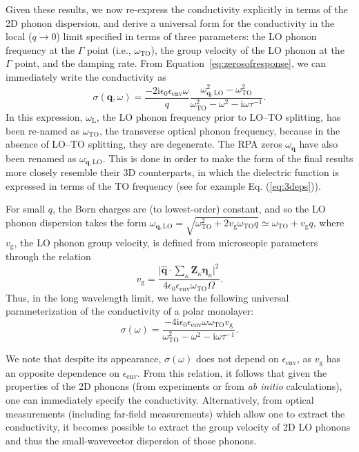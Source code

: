 \documentclass[aps,prb,twocolumn,
	           groupedaddress,superscriptaddress,
               amsfonts,amssymb,amsmath,floatfix,
	           citeautoscript]{revtex4-1}
\newcommand{\iu}{\mathrm{i}}
\begin{document}
Given these results, we now re-express the conductivity explicitly in terms of the 2D phonon dispersion, and derive a universal form for the conductivity in the local ($q\rightarrow 0$) limit specified in terms of three parameters: the LO phonon frequency at the $\Gamma$ point (i.e., $\omega_{\mathrm{TO}}$), the group velocity of the LO phonon at the $\Gamma$ point, and the damping rate. From Equation~\eqref{eq:zerosofresponse}, we can immediately write the conductivity as
  \begin{equation}
  \sigma(\mathbf{q},\omega) = \frac{-2\iu\epsilon_0\epsilon_{\mathrm{env}}\omega}{q}\frac{\omega^2_{\mathbf{q},\mathrm{LO}}-\omega^2_{\mathrm{TO}}}{\omega^2_{\mathrm{TO}}-\omega^2-\iu\omega\tau^{-1}}.
  \end{equation}
 In this expression, $\omega_\mathrm{L}$, the LO phonon frequency prior to LO--TO splitting, has been re-named as $\omega_{\mathrm{TO}}$, the transverse optical phonon frequency, because in the absence of LO--TO splitting, they are degenerate. The RPA zeros $\omega_{\mathbf{q}}$ have also been renamed as $\omega_{\mathbf{q},\mathrm{LO}}$. This is done in order to make the form of the final results more closely resemble their 3D counterparts, in which the dielectric function is expressed in terms of the TO frequency (see for example Eq. (\ref{eq:3deps})). 
 
 For small $q$,  the Born charges are (to lowest-order) constant, and so the LO phonon dispersion takes the form $\omega_{\mathbf{q},\mathrm{LO}}=\sqrt{\omega^2_{\mathrm{TO}}+2v_{\mathrm{g}}\omega_{\mathrm{TO}}q} \simeq \omega_{\mathrm{TO}} + v_{\mathrm{g}}q$, where $v_{\mathrm{g}}$, the LO phonon group velocity, is defined from microscopic parameters through the relation
 \begin{equation}
    v_{\mathrm{g}} = \frac{\Big|\hat{\mathbf{q}}\cdot \sum_\kappa \mathbf{Z}_\kappa\boldsymbol{\eta}_\kappa\Big|^2 }{4\epsilon_0 \epsilon_{\mathrm{env}}\omega_{\mathrm{TO}}\Omega}. 
\end{equation}
Thus, in the long wavelength limit, we have the following universal parameterization of the conductivity of a polar monolayer:
\begin{equation}
    \sigma(\omega) =  \frac{-4\iu\epsilon_0\epsilon_{\mathrm{env}}\omega\omega_{\mathrm{TO}}v_{\mathrm{g}}}{\omega^2_{\mathrm{TO}}-\omega^2-\iu\omega\tau^{-1}}.
    \label{eq:localsigma}
\end{equation}

We note that despite its appearance, $\sigma(\omega)$ does not depend on $\epsilon_{\mathrm{env}}$, as $v_{\mathrm{g}}$ has an opposite dependence on $\epsilon_{\mathrm{env}}$. From this relation, it follows that given the properties of the 2D phonons (from experiments or from \emph{ab initio} calculations), one can immediately specify the conductivity. Alternatively, from optical measurements (including far-field measurements) which allow one to extract the conductivity, it becomes possible to extract the group velocity of 2D LO phonons and thus the small-wavevector dispersion of those phonons. 
  
\end{document}
